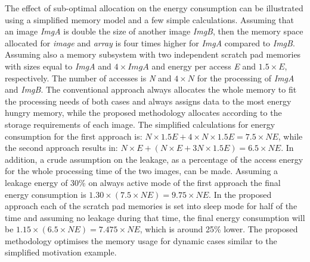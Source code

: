 \documentclass{acm_proc_article-sp}
\begin{document}
The effect of sub-optimal allocation on the energy consumption can be illustrated using a simplified memory model and a few simple calculations. Assuming that an image \textit{ImgA} is double the size of another image \textit{ImgB}, then the memory space allocated for \textit{image} and \textit{array} is four times higher for \textit{ImgA} compared to \textit{ImgB}. Assuming also a memory subsystem with two independent scratch pad memories with sizes equal to \textit{ImgA} and $4 \times \textit{ImgA}$ and energy per access \textit{E} and $1.5 \times E$, respectively. The number of accesses is \textit{N} and $ 4 \times N$ for the processing of \textit{ImgA} and \textit{ImgB}. The conventional approach always allocates the whole memory to fit the processing needs of both cases and always assigns data to the most energy hungry memory, while the proposed methodology allocates according to the storage requirements of each image. The simplified calculations for energy consumption for the first approach is: \begin{math}N \times 1.5E + 4 \times N \times 1.5E = 7.5 \times NE\end{math}, while the second approach results in: \begin{math}N \times E + ( N \times E + 3N \times 1.5E ) = 6.5 \times NE \end{math}. In addition, a crude assumption on the leakage, as a percentage of the access energy for the whole processing time of the two images, can be made. Assuming a leakage energy of 30\% on always active mode of the first approach the final energy consumption is $ 1.30 \times ( 7.5 \times NE )  = 9.75 \times NE$. In the proposed approach each of the scratch pad memories is set into sleep mode for half of the time and assuming no leakage during that time, the final energy consumption will be $ 1.15 \times ( 6.5 \times NE )  = 7.475 \times NE$, which is around 25\% lower. The proposed methodology optimises the memory usage for dynamic cases similar to the simplified motivation example.


\end{document}
